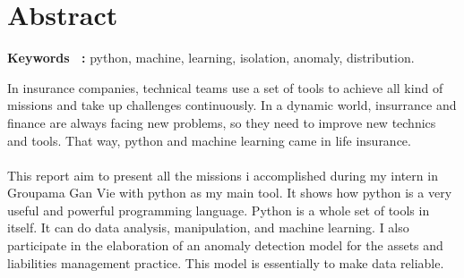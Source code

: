 \chapter*{Abstract}

\begin{singlespace}
\textbf {Keywords ~:} python, machine, learning, isolation, anomaly, distribution.
\end{singlespace}

In insurance companies, technical teams use a set of tools to achieve all kind of missions and take up challenges continuously. In a dynamic world, insurrance and finance are always facing new problems, so they need to improve new technics and tools. That way, python and machine learning came in life insurance. 
\\
\\
This report aim to present all the missions i accomplished during my intern in Groupama Gan Vie with python as my main tool. It shows how python is a very useful and powerful programming language. Python is a whole set of tools in itself. It can do data analysis, manipulation, and machine learning. I also participate in the elaboration of an anomaly detection model for the assets and liabilities management practice. This model is essentially to make data reliable.

